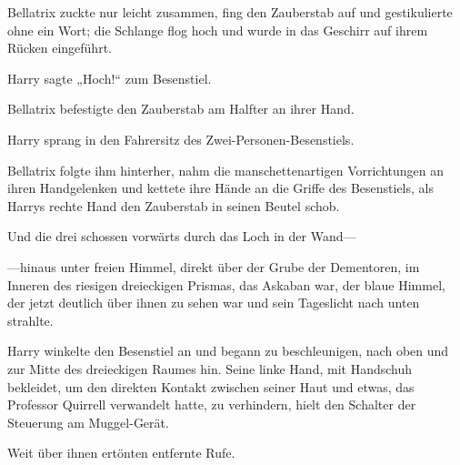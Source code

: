 Bellatrix zuckte nur leicht zusammen, fing den Zauberstab auf und gestikulierte ohne ein Wort; die Schlange flog hoch und wurde in das Geschirr auf ihrem Rücken eingeführt.

Harry sagte „Hoch!“ zum Besenstiel.

Bellatrix befestigte den Zauberstab am Halfter an ihrer Hand.

Harry sprang in den Fahrersitz des Zwei-Personen-Besenstiels.

Bellatrix folgte ihm hinterher, nahm die manschettenartigen Vorrichtungen an ihren Handgelenken und kettete ihre Hände an die Griffe des Besenstiels, als Harrys rechte Hand den Zauberstab in seinen Beutel schob.

Und die drei schossen vorwärts durch das Loch in der Wand—

—hinaus unter freien Himmel, direkt über der Grube der Dementoren, im Inneren des riesigen dreieckigen Prismas, das Askaban war, der blaue Himmel, der jetzt deutlich über ihnen zu sehen war und sein Tageslicht nach unten strahlte.

Harry winkelte den Besenstiel an und begann zu beschleunigen, nach oben und zur Mitte des dreieckigen Raumes hin. Seine linke Hand, mit Handschuh bekleidet, um den direkten Kontakt zwischen seiner Haut und etwas, das Professor Quirrell verwandelt hatte, zu verhindern, hielt den Schalter der Steuerung am Muggel-Gerät.

Weit über ihnen ertönten entfernte Rufe.

